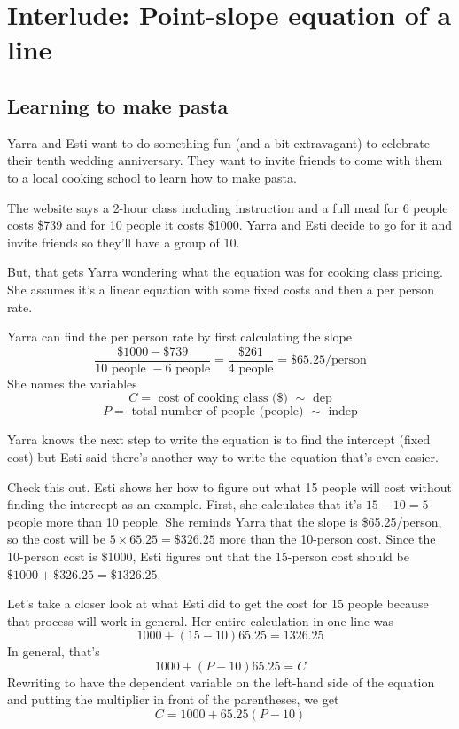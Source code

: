 
\section{Interlude: Point-slope equation of a line} 

\subsection*{Learning to make pasta}

Yarra and Esti want to do something fun (and a bit extravagant) to celebrate their tenth wedding anniversary.  They want to invite friends to come with them to a local cooking school to learn how to make pasta. 

The website says a 2-hour class including instruction and a full meal for 6 people costs \$739 and for 10 people it costs \$1000.  Yarra and Esti decide to go for it and invite friends so they'll have a group of 10.

But, that gets Yarra  wondering what the equation was for cooking class pricing.  She assumes it's a linear equation with some fixed costs and then a per person rate.

Yarra can find the per person rate by first calculating the slope
$$\frac{\$1000-\$739}{10 \text{ people } - 6 \text{ people}} = \frac{\$261}{4 \text{ people}} = \$65.25/\text{person}$$
She names the variables
$$C = \text{ cost of cooking class (\$) } \sim \text{ dep}$$
$$P = \text{ total number of people (people) } \sim \text{ indep}$$

Yarra knows the next step to write the equation is to find the intercept (fixed cost) but Esti said there's another way to write the equation that's even easier.  

Check this out.  Esti shows her how to figure out what 15 people will cost without finding the intercept as an example.  First, she calculates that it's $15-10=5$ people more than 10 people.  She reminds Yarra that the slope is \$65.25/person, so the cost will be $5 \times 65.25 = \$326.25$ more than the 10-person cost.  Since the 10-person cost is \$1000, Esti figures out that the 15-person cost should be $\$1000 + \$326.25 = \$1326.25$.

Let's take a closer look at what Esti did to get the cost for 15 people because that process will work in general.  Her entire calculation in one line was
$$1000 + (15-10)65.25 = 1326.25$$
In general, that's
$$1000 + (P-10)65.25 = C$$
Rewriting to have the dependent variable on the left-hand side of the equation and putting the multiplier in front of the parentheses, we get
$$C = 1000 + 65.25(P-10)$$

